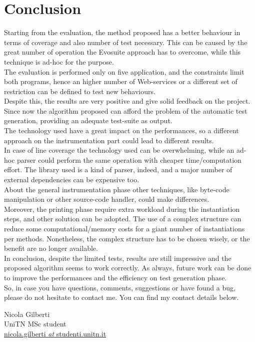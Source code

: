 \chapter{Conclusion}\label{ch:conclusion}
Starting from the evaluation, the method proposed has a better behaviour in terms of coverage and also number of test necessary.
This can be caused by the great number of operation the Evosuite approach has to overcome, while this technique is ad-hoc for the purpose.\\
The evaluation is performed only on five application, and the constraints limit both programs, hence an higher number of Web-services or a different set of restriction can be defined to test new behaviours.\\
Despite this, the results are very positive and give solid feedback on the project.
Since now the algorithm proposed can afford the problem of the automatic test generation, providing an adequate test-suite as output.\\
The technology used have a great impact on the performances, so a different approach on the instrumentation part could lead to different results.\\
In case of line coverage the technology used can be overwhelming, while an ad-hoc parser could perform the same operation with cheaper time/computation effort.
The library used is a kind of parser, indeed, and a major number of external dependencies can be expensive too.\\
About the general instrumentation phase other techniques, like byte-code manipulation or other source-code handler, could make differences.\\
Moreover, the printing phase require extra workload during the instantiation steps, and other solution can be adopted.
The use of a complex structure can reduce some computational/memory costs for a giant number of instantiations per methods.
Nonetheless, the complex structure has to be chosen wisely, or the benefit are no longer available.\\
In conclusion, despite the limited tests, results are still impressive and the proposed algorithm seems to work correctly.
As always, future work can be done to improve the performances and the efficiency on test generation phase.\\

So, in case you have questions, comments, suggestions or have found a bug, please do not hesitate to contact me. You can find my contact details below.
  \begin{center}
    Nicola Gilberti\\
    UniTN MSc student\\
    
    \href{mailto:nicola.gilberti@studenti.unitn.it}{\footnotesize nicola.gilberti \textit{at} studenti.unitn.it}
  \end{center}

\newpage
